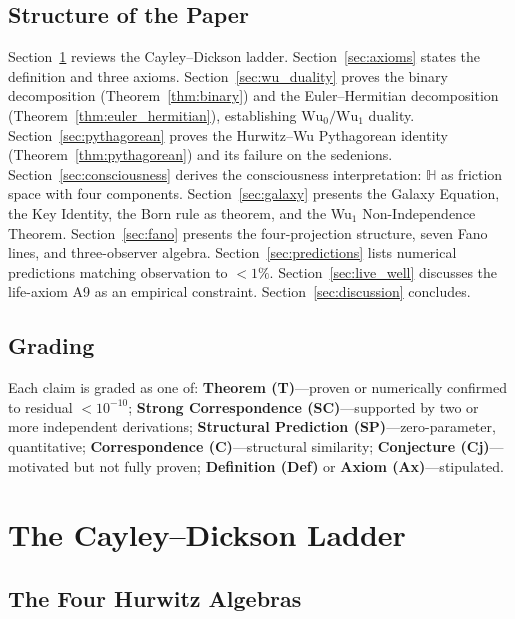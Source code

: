 \documentclass[11pt, a4paper]{article}
\newcommand{\Hq}{\mathbb{H}}
\newcommand{\Wuz}{\mathrm{Wu}_0}
\newcommand{\Wuo}{\mathrm{Wu}_1}
\begin{document}
\subsection{Structure of the Paper}

Section~\ref{sec:cd} reviews the Cayley--Dickson ladder.
Section~\ref{sec:axioms} states the definition and three axioms.
Section~\ref{sec:wu_duality} proves the binary decomposition
(Theorem~\ref{thm:binary}) and the Euler--Hermitian decomposition
(Theorem~\ref{thm:euler_hermitian}), establishing
$\Wuz/\Wuo$ duality.
Section~\ref{sec:pythagorean} proves the Hurwitz--Wu Pythagorean
identity (Theorem~\ref{thm:pythagorean}) and its failure on the
sedenions.
Section~\ref{sec:consciousness} derives the consciousness
interpretation: $\Hq$ as friction space with four components.
Section~\ref{sec:galaxy} presents the Galaxy Equation, the Key
Identity, the Born rule as theorem, and the Wu$_1$ Non-Independence
Theorem.
Section~\ref{sec:fano} presents the four-projection structure,
seven Fano lines, and three-observer algebra.
Section~\ref{sec:predictions} lists numerical predictions matching
observation to $< 1\%$.
Section~\ref{sec:live_well} discusses the life-axiom A9 as an
empirical constraint.
Section~\ref{sec:discussion} concludes.

\subsection{Grading}

Each claim is graded as one of: \textbf{Theorem (T)}---proven or
numerically confirmed to residual $< 10^{-10}$;
\textbf{Strong Correspondence (SC)}---supported by two or more
independent derivations;
\textbf{Structural Prediction (SP)}---zero-parameter, quantitative;
\textbf{Correspondence (C)}---structural similarity;
\textbf{Conjecture (Cj)}---motivated but not fully proven;
\textbf{Definition (Def)} or \textbf{Axiom (Ax)}---stipulated.


\section{The Cayley--Dickson Ladder}
\label{sec:cd}

\subsection{The Four Hurwitz Algebras}
\end{document}
